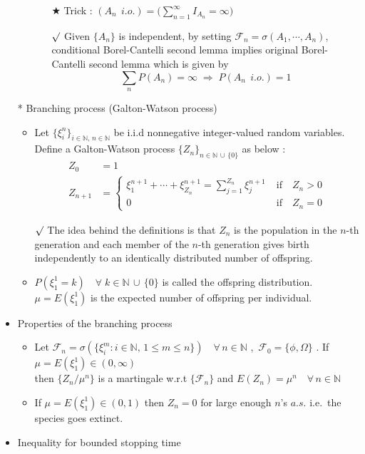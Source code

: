 \documentclass[12pt, A4]{article}
\newcommand{\rmk}{$\surd$}
\newcommand{\trick}{$\bigstar$}
\newcommand{\N}{\mathbb{N}}
\newcommand{\F}{\mathcal{F}}
\newcommand{\union}{\,\cup\,}
\newcommand{\foranyn}{\quad \forall \, n\in \N}
\begin{document}
\begin{itemize}
\begin{itemize}
\begin{itemize}
			\item[\trick] Trick : $(A_n\;\,i.o.)=\big(\sum_{n=1}^\infty I_{A_n}=\infty \big)$
			\item[\rmk] Given $\{A_n\}$ is independent, by setting $\F_n=\sigma(A_1, \cdots, A_n)$, conditional Borel-Cantelli second lemma implies original Borel-Cantelli second lemma which is given by $$\sum_n P(A_n)=\infty \;\Rightarrow \;P(A_n\;\, i.o.)=1 $$   
		\end{itemize}
	\end{itemize}
	\item[*] Branching process (Galton-Watson process)
	\begin{itemize}
		\item Let $\{\xi_i^n\}_{i\in \N,\, n\in \N}$ be i.i.d nonnegative integer-valued random variables. \\Define a Galton-Watson process $\{Z_n\}_{n\in \N\union \{0\}}$ as below : 
		\begin{align*}
			Z_0 &=1 \\
			Z_{n+1} &= \begin{cases}
				\xi_1^{n+1}+\cdots+\xi_{Z_n}^{n+1}=\sum_{j=1}^{Z_n}\xi_j^{n+1} & \;\text{if}\quad Z_n>0 \\
				0 & \;\text{if}\quad Z_n=0
			\end{cases}
		\end{align*}
		\item[\rmk] The idea behind the definitions is that $Z_n$ is the population in the $n$-th generation and each member of the $n$-th generation gives birth independently to an identically distributed number of offspring.
		\item $P(\xi_1^1=k)\quad \forall \;k\in\N\union\{0\}$ is called the offspring distribution. $\mu=E(\xi_1^1)$ is the expected number of offspring per individual.   
	\end{itemize}
	\item Properties of the branching process
	\begin{itemize}
		\item Let $\F_n=\sigma(\{\xi_i^m : i\in\N,\, 1\leq m\leq n\})\foranyn$ ,\, $\F_0=\{\phi, \Omega\}$ . If $\mu=E(\xi_1^1)\in (0,\infty)$ \\ then $\{Z_n/\mu^n\}$ is a martingale w.r.t $\{\F_n\}$ and $E(Z_n)=\mu^n\foranyn$
		\item If $\mu=E(\xi_1^1)\in(0,1)$ then $Z_n=0$ for large enough $n$'s $a.s.$ \;i.e.\, the species goes extinct.
	\end{itemize}
	\item Inequality for bounded stopping time

\end{itemize}
\end{document}
